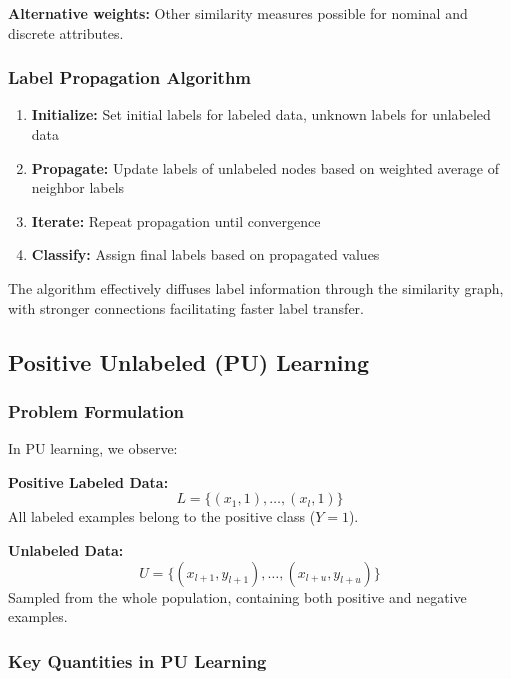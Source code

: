 \documentclass[12pt,a4paper]{article}
\begin{document}
\textbf{Alternative weights:} Other similarity measures possible for nominal and discrete attributes.

\subsubsection{Label Propagation Algorithm}

\begin{enumerate}
    \item \textbf{Initialize:} Set initial labels for labeled data, unknown labels for unlabeled data
    \item \textbf{Propagate:} Update labels of unlabeled nodes based on weighted average of neighbor labels
    \item \textbf{Iterate:} Repeat propagation until convergence
    \item \textbf{Classify:} Assign final labels based on propagated values
\end{enumerate}

The algorithm effectively diffuses label information through the similarity graph, with stronger connections facilitating faster label transfer.

\subsection{Positive Unlabeled (PU) Learning}

\subsubsection{Problem Formulation}

In PU learning, we observe:

\textbf{Positive Labeled Data:}
\begin{equation}
L = \{(x_1, 1), \ldots, (x_l, 1)\}
\end{equation}
All labeled examples belong to the positive class ($Y = 1$).

\textbf{Unlabeled Data:}
\begin{equation}
U = \{(x_{l+1}, y_{l+1}), \ldots, (x_{l+u}, y_{l+u})\}
\end{equation}
Sampled from the whole population, containing both positive and negative examples.

\subsubsection{Key Quantities in PU Learning}
\end{document}
